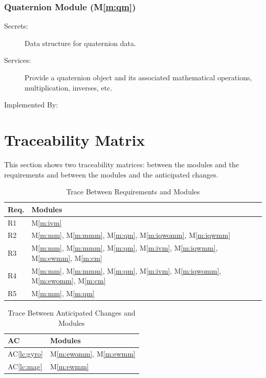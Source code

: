 \documentclass[12pt, titlepage]{article}
\newcommand{\acref}[1]{AC\ref{#1}}
\newcommand{\mref}[1]{M\ref{#1}}
\begin{document}
\subsubsection{Quaternion Module (\mref{m:qm})}
\begin{description}
  \item[Secrets:] Data structure for quaternion data.
  \item[Services:] Provide a quaternion object and its associated mathematical operations, multiplication, inverses, etc.
  \item[Implemented By:] \progname
\end{description}

\section{Traceability Matrix} \label{SecTM}

This section shows two traceability matrices: between the modules and the requirements and between
the modules and the anticipated changes.

\begin{table}[H]
\centering
\begin{tabular}{p{} p{}}
\toprule
\textbf{Req.} & \textbf{Modules}\\
\midrule
R1 & \mref{m:ivm} \\
R2 & \mref{m:mm}, \mref{m:mmm}, \mref{m:qm}, \mref{m:iqwomm}, \mref{m:iqwmm}\\
R3 & \mref{m:mm}, \mref{m:mmm}, \mref{m:qm}, \mref{m:ivm}, \mref{m:iqwmm}, \mref{m:ewmm}, \mref{m:cm}\\
R4 & \mref{m:mm}, \mref{m:mmm}, \mref{m:qm}, \mref{m:ivm}, \mref{m:iqwomm}, \mref{m:ewomm}, \mref{m:cm}\\
R5 & \mref{m:mm}, \mref{m:qm}\\
\bottomrule
\end{tabular}
\caption{Trace Between Requirements and Modules}
\label{TblRT}
\end{table}

\begin{table}[H]
\centering
\begin{tabular}{p{} p{}}
\toprule
\textbf{AC} & \textbf{Modules}\\
\midrule
\acref{lc:gyro} & \mref{m:ewomm}, \mref{m:ewmm}\\
\acref{lc:mag} & \mref{m:ewmm}\\
\bottomrule
\end{tabular}
\caption{Trace Between Anticipated Changes and Modules}
\label{TblACT}
\end{table}
\end{document}
